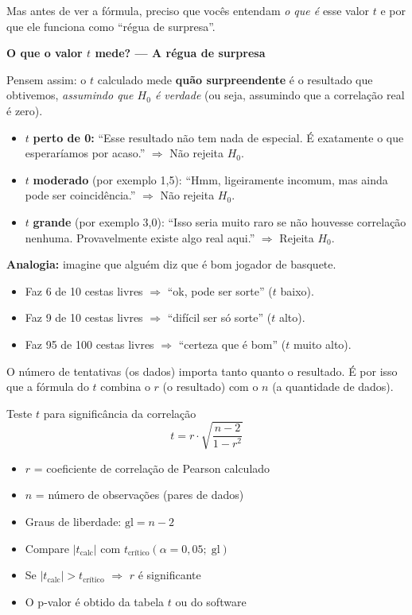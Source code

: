 Mas antes de ver a fórmula, preciso que vocês entendam \emph{o que é}
esse valor $t$ e por que ele funciona como ``régua de surpresa''.

\begin{SolvedBox}
\textbf{O que o valor $t$ mede? — A régua de surpresa}

Pensem assim: o $t$ calculado mede \textbf{quão surpreendente} é o
resultado que obtivemos, \emph{assumindo que $H_0$ é verdade}
(ou seja, assumindo que a correlação real é zero).

\begin{itemize}
  \item $t$ \textbf{perto de 0:} ``Esse resultado não tem nada de especial.
  É exatamente o que esperaríamos por acaso.'' $\Rightarrow$ Não rejeita $H_0$.
  \item $t$ \textbf{moderado} (por exemplo 1,5): ``Hmm, ligeiramente
  incomum, mas ainda pode ser coincidência.'' $\Rightarrow$ Não rejeita $H_0$.
  \item $t$ \textbf{grande} (por exemplo 3,0): ``Isso seria muito raro
  se não houvesse correlação nenhuma. Provavelmente existe algo real aqui.''
  $\Rightarrow$ Rejeita $H_0$.
\end{itemize}

\textbf{Analogia:} imagine que alguém diz que é bom jogador de basquete.
\begin{itemize}
  \item Faz 6 de 10 cestas livres $\Rightarrow$ ``ok, pode ser sorte'' ($t$ baixo).
  \item Faz 9 de 10 cestas livres $\Rightarrow$ ``difícil ser só sorte'' ($t$ alto).
  \item Faz 95 de 100 cestas livres $\Rightarrow$ ``certeza que é bom'' ($t$ muito alto).
\end{itemize}

O número de tentativas (os dados) importa tanto quanto o resultado.
É por isso que a fórmula do $t$ combina o $r$ (o resultado) com o $n$
(a quantidade de dados).
\end{SolvedBox}

\begin{FormulaBox}{Teste $t$ para significância da correlação}
\[
t = r \cdot \sqrt{\frac{n - 2}{1 - r^2}}
\]
\begin{itemize}
  \item $r$ = coeficiente de correlação de Pearson calculado
  \item $n$ = número de observações (pares de dados)
  \item Graus de liberdade: $\text{gl} = n - 2$
  \item Compare $|t_{\text{calc}}|$ com $t_{\text{crítico}}(\alpha = 0{,}05;\; \text{gl})$
  \item Se $|t_{\text{calc}}| > t_{\text{crítico}}$ $\Rightarrow$ $r$ é significante
  \item O p-valor é obtido da tabela $t$ ou do software
\end{itemize}
\end{FormulaBox}


